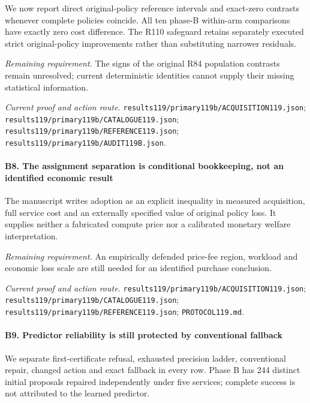 We now report direct original-policy reference intervals and exact-zero contrasts whenever complete policies coincide. All ten phase-B within-arm comparisons have exactly zero cost difference. The R110 safeguard retains separately executed strict original-policy improvements rather than substituting narrower residuals.

\par\emph{Remaining requirement.} The signs of the original R84 population contrasts remain unresolved; current deterministic identities cannot supply their missing statistical information.

\par\emph{Current proof and action route.} \nolinkurl{results119/primary119b/ACQUISITION119.json}; \nolinkurl{results119/primary119b/CATALOGUE119.json}; \nolinkurl{results119/primary119b/REFERENCE119.json}; \nolinkurl{results119/primary119b/AUDIT119B.json}.

\paragraph{B8. The assignment separation is conditional bookkeeping, not an identified economic result}

The manuscript writes adoption as an explicit inequality in measured acquisition, full service cost and an externally specified value of original policy loss. It supplies neither a fabricated compute price nor a calibrated monetary welfare interpretation.

\par\emph{Remaining requirement.} An empirically defended price-fee region, workload and economic loss scale are still needed for an identified purchase conclusion.

\par\emph{Current proof and action route.} \nolinkurl{results119/primary119b/ACQUISITION119.json}; \nolinkurl{results119/primary119b/CATALOGUE119.json}; \nolinkurl{results119/primary119b/REFERENCE119.json}; \nolinkurl{PROTOCOL119.md}.

\paragraph{B9. Predictor reliability is still protected by conventional fallback}

We separate first-certificate refusal, exhausted precision ladder, conventional repair, changed action and exact fallback in every row. Phase B has 244 distinct initial proposals repaired independently under five services; complete success is not attributed to the learned predictor.

